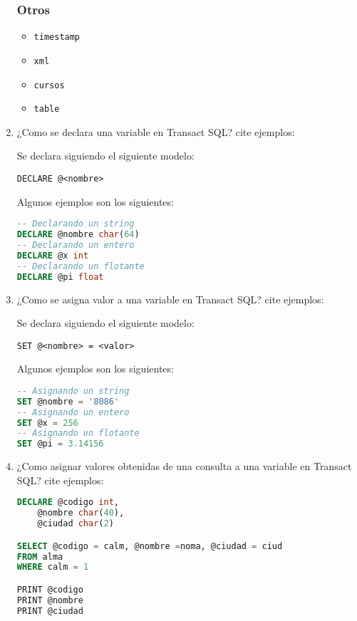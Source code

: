 \begin{enumerate}
\subsubsection*{Otros}

\begin{itemize}
\item \texttt{timestamp}
\item \texttt{xml}
\item \texttt{cursos}
\item \texttt{table}
\end{itemize}

\item ¿Como se declara una variable en Transact SQL? cite ejemplos:

Se declara siguiendo el siguiente modelo:

\begin{center}
\texttt{DECLARE @<nombre>}
\end{center}

Algunos ejemplos son los siguientes:
\begin{lstlisting}[language=SQL]
-- Declarando un string
DECLARE @nombre char(64)
-- Declarando un entero
DECLARE @x int
-- Declarando un flotante
DECLARE @pi float
\end{lstlisting}

\item ¿Como se asigna valor a una variable en Transact SQL? cite ejemplos:

Se declara siguiendo el siguiente modelo:

\begin{center}
\texttt{SET @<nombre> = <valor>}
\end{center}

Algunos ejemplos son los siguientes:
\begin{lstlisting}[language=SQL]
-- Asignando un string
SET @nombre = '8086'
-- Asignando un entero
SET @x = 256
-- Asignando un flotante
SET @pi = 3.14156
\end{lstlisting}

\item ¿Como asignar valores obtenidas de una consulta a una variable en Transact SQL? cite ejemplos:

\begin{lstlisting}[language=SQL]
DECLARE @codigo int,
	@nombre char(40),
	@ciudad char(2)

SELECT @codigo = calm, @nombre =noma, @ciudad = ciud
FROM alma
WHERE calm = 1

PRINT @codigo
PRINT @nombre
PRINT @ciudad
\end{lstlisting}


\end{enumerate}
